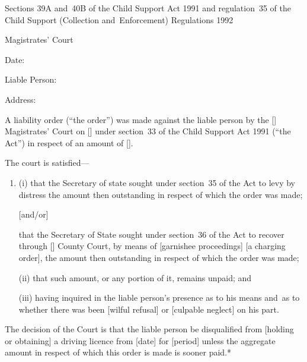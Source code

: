 \documentclass[12pt,a4paper]{article}
\begin{document}

\medskip

\noindent
Sections 39A and~40B of the Child Support Act 1991 and regulation~35 of the Child Support (Collection and~Enforcement) Regulations 1992

\medskip

{\raggedleft \hspace{0.5\linewidth}\dotfill Magistrates' Court

}

\medskip

Date:

\medskip

Liable Person:

\medskip

Address:

\medskip

A liability order (``the order'') was made against the liable person by the [\phantom{Bolton}] Magistrates' Court on [\phantom{\today}] under section~33 of the Child Support Act 1991 (``the Act'') in respect of an amount of [\phantom{£100.00}].

The court is satisfied---
\begin{enumerate}
\item[]
(i) that the Secretary of state sought under section~35 of the Act to levy by distress the amount then outstanding in respect of which the order was made;

[and/or]

that the Secretary of State sought under section~36 of the Act to recover through [\phantom{Bolton}] County Court, by means of [garnishee proceedings] [a charging order], the amount then outstanding in respect of which the order was made;

(ii) that such amount, or any portion of it, remains unpaid; and

(iii) having inquired in the liable person's presence as to his means and~as to whether there was been [wilful refusal] or [culpable neglect] on his part.
\end{enumerate}

The decision of the Court is that the liable person be disqualified from [holding or obtaining] a driving licence from [date] for [period] unless the aggregate amount in respect of which this order is made is sooner paid.*

\medskip
\end{document}
